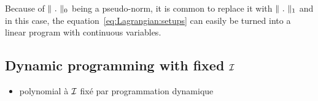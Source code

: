 Because of $\norm{\ .\ }_0$ being a pseudo-norm, it is common to replace it with $\norm{\ .\ }_1$ and in this case, the equation~\eqref{eq:Lagrangian:setups} can easily be turned into a linear program with continuous variables.



\subsection{Dynamic programming with fixed $\mathcal{I}$}


\begin{itemize}
  \item polynomial à $\mathcal{I}$ fixé par programmation dynamique
\end{itemize}
